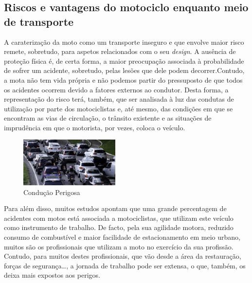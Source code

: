 \documentclass{report}
\begin{document}
\subsection{Riscos e vantagens do motociclo enquanto meio de transporte}
A caraterização da moto como um transporte inseguro e que envolve maior risco remete, sobretudo, para aspetos relacionados com o seu \textit{design}. A ausência de proteção física é, de certa forma, a maior preocupação associada à probabilidade de sofrer um acidente, sobretudo, pelas lesões que dele podem decorrer.Contudo, a mota não tem vida própria e não podemos partir do pressuposto de que todos os acidentes ocorrem devido a fatores externos ao condutor. Desta forma, a representação do risco terá, também, que ser analisada à luz das condutas de utilização por parte dos motociclistas e, até mesmo, das condições em que se encontram as vias de circulação, o trânsito existente e as situações de imprudência em que o motorista, por vezes, coloca o veículo.
\begin{figure}[h]
\center
\includegraphics[width=5cm]{condução perigosa.jpg} %
\caption{Condução Perigosa}
\label{figura:Condução Perigosa}
\end{figure}
Para além disso, muitos estudos apontam que uma grande percentagem de acidentes com motos está associada a motociclistas, que utilizam este veículo como instrumento de trabalho. De facto, pela sua agilidade motora, reduzido consumo de combustível e maior facilidade de estacionamento em meio urbano, muitos são os profissionais que utilizam a moto no exercício da sua profissão. Contudo, para muitos destes profissionais, que vão desde a área da restauração, forças de segurança…, a jornada de trabalho pode ser extensa, o que, também, os deixa mais expostos aos perigos.
\end{document}
